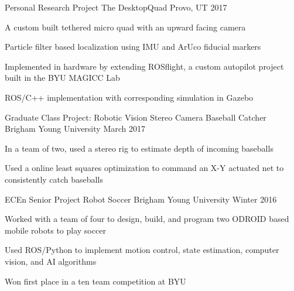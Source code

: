 

\begin{cventries}

  \cventry
    {Personal Research Project} %
    {The DesktopQuad} %
    {Provo, UT} %
    {2017} %
    {
      \begin{cvitems} %
      \item {A custom built tethered micro quad with an upward facing camera}
      \item {Particle filter based localization using IMU and ArUco fiducial markers}
      \item {Implemented in hardware by extending ROSflight, a custom autopilot project built in the BYU MAGICC Lab}
      \item {ROS/C++ implementation with corresponding simulation in Gazebo}
      \end{cvitems}
    }

  \cventry
    {Graduate Class Project: Robotic Vision} %
    {Stereo Camera Baseball Catcher} %
    {Brigham Young University} %
    {March 2017} %
    {
      \begin{cvitems} %
      \item {In a team of two, used a stereo rig to estimate depth of incoming baseballs}
      \item {Used a online least squares optimization to command an X-Y actuated net to consistently catch baseballs }
      \end{cvitems}
    }

  \cventry
    {ECEn Senior Project} %
    {Robot Soccer} %
    {Brigham Young University} %
    {Winter 2016} %
    {
      \begin{cvitems} %
      \item {Worked with a team of four to design, build, and program two ODROID based mobile robots to play soccer}
      \item {Used ROS/Python to implement motion control, state estimation, computer vision, and AI algorithms}
      \item {Won first place in a ten team competition at BYU}
      \end{cvitems}
    }


\end{cventries}
